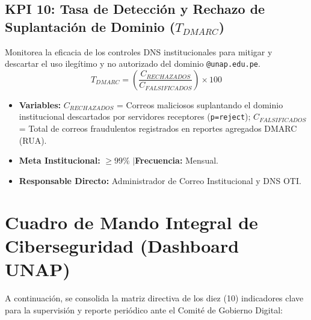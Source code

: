 \subsection{KPI 10: Tasa de Detección y Rechazo de Suplantación de Dominio \texorpdfstring{($T_{DMARC}$)}{(T\_DMARC)}}
Monitorea la eficacia de los controles DNS institucionales para mitigar y descartar el uso ilegítimo y no autorizado del dominio \texttt{@unap.edu.pe}.
\[
T_{DMARC} = \left( \frac{C_{RECHAZADOS}}{C_{FALSIFICADOS}} \right) \times 100
\]
\begin{itemize}[leftmargin=1.5em, itemsep=1pt]
    \item \textbf{Variables:} $C_{RECHAZADOS}$ = Correos maliciosos suplantando el dominio institucional descartados por servidores receptores (\texttt{p=reject}); $C_{FALSIFICADOS}$ = Total de correos fraudulentos registrados en reportes agregados DMARC (RUA).
    \item \textbf{Meta Institucional:} $\ge 99\%$ \quad$\vert$\quad \textbf{Frecuencia:} Mensual.
    \item \textbf{Responsable Directo:} Administrador de Correo Institucional y DNS OTI.
\end{itemize}

\newpage

\section{Cuadro de Mando Integral de Ciberseguridad (Dashboard UNAP)}

A continuación, se consolida la matriz directiva de los diez (10) indicadores clave para la supervisión y reporte periódico ante el Comité de Gobierno Digital:


